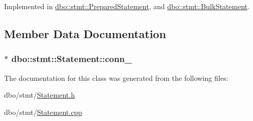 Implemented in \hyperlink{classdbo_1_1stmt_1_1_prepared_statement_a65620d8b28b279d717ed6a787f89ad70}{dbo\+::stmt\+::\+Prepared\+Statement}, and \hyperlink{classdbo_1_1stmt_1_1_bulk_statement_aaa5722c838af4203ae19bd94448d63dd}{dbo\+::stmt\+::\+Bulk\+Statement}.



\subsection{Member Data Documentation}
\hypertarget{classdbo_1_1stmt_1_1_statement_ae2fbf1f27c829b348afa751e7d04f934}{
\subsubsection[{conn\+\_\+}]{$\ast$ dbo\+::stmt\+::\+Statement\+::conn\+\_\+\hspace{0.3cm}{\ttfamily [protected]}}}\label{classdbo_1_1stmt_1_1_statement_ae2fbf1f27c829b348afa751e7d04f934}


The documentation for this class was generated from the following files\+:\begin{DoxyCompactItemize}
\item 
dbo/stmt/\hyperlink{_statement_8h}{Statement.\+h}\item 
dbo/stmt/\hyperlink{_statement_8cpp}{Statement.\+cpp}\end{DoxyCompactItemize}
